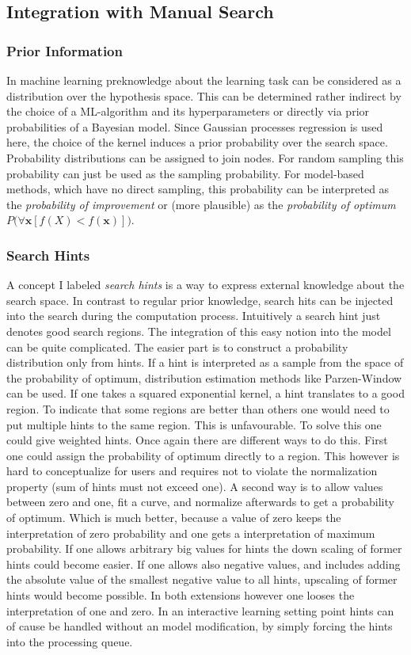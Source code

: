 \documentclass[english]{article}
\newcommand{\x}{\mathbf{x}}
\begin{document}
\subsection{Integration with Manual Search}
\subsubsection*{Prior Information}
In machine learning preknowledge about the learning task can be considered as a distribution over the hypothesis space. This can be determined rather indirect by the choice of a ML-algorithm and its hyperparameters or directly via prior probabilities of a Bayesian model. Since Gaussian processes regression is used here, the choice of the kernel induces a prior probability over the search space.
Probability distributions can be assigned to join nodes.  For random sampling this probability can just be used as the sampling probability. For model-based methods, which have no direct sampling, this probability can be interpreted as the \textit{probability of improvement} or (more plausible) as the \textit{probability of optimum} $P\big(\forall \x[f(X) < f(\x)]\big)$.

\subsubsection*{Search Hints}
A concept I labeled \textit{search hints} is a way to express external knowledge about the search space. In contrast to regular prior knowledge, search hits can be injected into the search during the computation process. Intuitively a search hint just denotes good search regions. The integration of this easy notion into the model can be quite complicated.
The easier part is to construct a probability distribution only from hints. If a hint is interpreted as a sample from the space of the probability of optimum, distribution estimation methods like Parzen-Window can be used. If one takes a squared exponential kernel, a hint translates to a good region. To indicate that some regions are better than others one would need to put multiple hints to the same region. This is unfavourable. To solve this one could give weighted hints. Once again there are different ways to do this.
First one could assign the probability of optimum directly to a region. This however is hard to conceptualize for users and requires not to violate the normalization property (sum of hints must not exceed one).
A second way is to allow values between zero and one, fit a curve, and normalize afterwards to get a probability of optimum. Which is much better, because a value of zero keeps the interpretation of zero probability and one gets a interpretation of maximum probability. If one allows arbitrary big values for hints the down scaling of former hints could become easier. If one allows also negative values, and includes adding the absolute value of the smallest negative value to all hints, upscaling of former hints would become possible. In both extensions however one looses the interpretation of one and zero.
In an interactive learning setting point hints can of cause be handled without an model modification, by simply forcing the hints into the processing queue.
\end{document}
